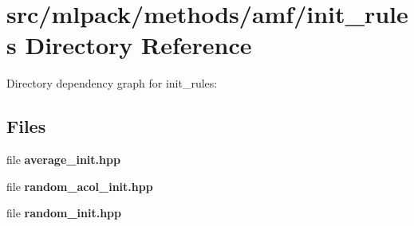 \section{src/mlpack/methods/amf/init\-\_\-rules Directory Reference}
\label{dir_af3c9e74a6f935da1c686fdcc68545c9}
Directory dependency graph for init\-\_\-rules\-:
\subsection*{Files}
\begin{DoxyCompactItemize}
\item 
file {\bf average\-\_\-init.\-hpp}
\item 
file {\bf random\-\_\-acol\-\_\-init.\-hpp}
\item 
file {\bf random\-\_\-init.\-hpp}
\end{DoxyCompactItemize}
